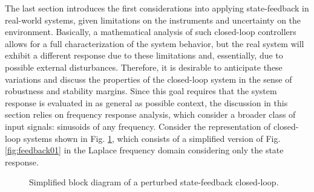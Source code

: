 \documentclass[a4paper,11pt]{book}
\numberwithin{figure}{chapter}
\numberwithin{equation}{chapter}
\numberwithin{table}{chapter}
\theoremstyle{definition}
\begin{document}
The last section introduces the first considerations into applying state-feedback in real-world systems, given limitations on the instruments and uncertainty on the environment. Basically, a mathematical analysis of such closed-loop controllers allows for a full characterization of the system behavior, but the real system will exhibit a different response due to these limitations and, essentially, due to possible external disturbances. Therefore, it is desirable to anticipate these variations and discuss the properties of the closed-loop system in the sense of robustness and stability margins. Since this goal requires that the system response is evaluated in as general as possible context, the discussion in this section relies on frequency response analysis, which consider a broader class of input signals: sinusoids of any frequency. Consider the representation of closed-loop systems shown in Fig. \ref{fig:properties01}, which consists of a simplified version of Fig. \ref{fig:feedback01} in the Laplace frequency domain considering only the state response.

\begin{figure}[ht]
    \centering
    \caption{Simplified block diagram of a perturbed state-feedback closed-loop.}
    \label{fig:properties01}
\end{figure}
\end{document}
